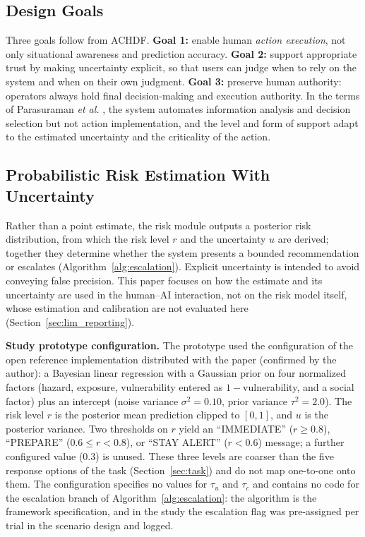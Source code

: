 \documentclass[journal]{IEEEtran}
\theoremstyle{plain}
\theoremstyle{definition}
\begin{document}
    \subsection{Design Goals}
    Three goals follow from ACHDF. \textbf{Goal 1:} enable human \emph{action execution}, not only situational awareness and prediction accuracy. \textbf{Goal 2:} support appropriate trust \cite{Lee2004} by making uncertainty explicit, so that users can judge when to rely on the system and when on their own judgment. \textbf{Goal 3:} preserve human authority: operators always hold final decision-making and execution authority. In the terms of Parasuraman \emph{et al.} \cite{Parasuraman2000LOA}, the system automates information analysis and decision selection but not action implementation, and the level and form of support adapt to the estimated uncertainty and the criticality of the action.

    \subsection{Probabilistic Risk Estimation With Uncertainty}
    \label{sec:risk}
    Rather than a point estimate, the risk module outputs a posterior risk distribution, from which the risk level $r$ and the uncertainty $u$ are derived; together they determine whether the system presents a bounded recommendation or escalates (Algorithm~\ref{alg:escalation}). Explicit uncertainty is intended to avoid conveying false precision. This paper focuses on how the estimate and its uncertainty are used in the human--AI interaction, not on the risk model itself, whose estimation and calibration are not evaluated here (Section~\ref{sec:lim_reporting}).

    \textbf{Study prototype configuration.} The prototype used the configuration of the open reference implementation distributed with the paper (confirmed by the author): a Bayesian linear regression with a Gaussian prior on four normalized factors (hazard, exposure, vulnerability entered as $1-$vulnerability, and a social factor) plus an intercept (noise variance $\sigma^2=0.10$, prior variance $\tau^2=2.0$). The risk level $r$ is the posterior mean prediction clipped to $[0,1]$, and $u$ is the posterior variance. Two thresholds on $r$ yield an ``IMMEDIATE'' ($r \ge 0.8$), ``PREPARE'' ($0.6 \le r < 0.8$), or ``STAY ALERT'' ($r < 0.6$) message; a further configured value (0.3) is unused. These three levels are coarser than the five response options of the task (Section~\ref{sec:task}) and do not map one-to-one onto them. The configuration specifies no values for $\tau_u$ and $\tau_c$ and contains no code for the escalation branch of Algorithm~\ref{alg:escalation}: the algorithm is the framework specification, and in the study the escalation flag was pre-assigned per trial in the scenario design and logged.
\end{document}
